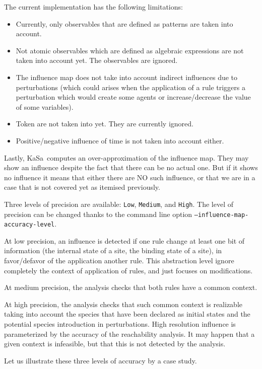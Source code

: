 \documentclass[11pt]{book}
\begin{document}
The current implementation has the following limitations:
\begin{itemize}
\item Currently, only observables that are defined as patterns are taken into account.
\item Not atomic observables which are defined as algebraic expressions are not taken into account yet. The observables are ignored.
\item The influence map does not take into account indirect influences due to perturbations (which could arises when the application of a rule triggers a perturbation which would create some agents or increase/decrease the value of some variables).
\item Token are not taken into yet. They are currently ignored.
\item Positive/negative influence of time is not taken into account either.
\end{itemize}

Lastly, KaSa\ computes an over-approximation of the influence map. They may show an influence despite the fact that there can be no actual one. But if it shows no influence it means that either there are NO such influence, or that we are in a case that is not covered yet as itemised previously.

Three levels of precision are available: \texttt{Low}, \texttt{Medium}, and
\texttt{High}. The level of precision can be changed thanks to the command line option \texttt{--influence-map-accuracy-level}.

At low precision, an influence is detected if one rule change at least one bit of information (the internal state of a site, the binding state of a site), in favor/defavor of the application another rule. This abstraction level ignore completely the context of application of rules, and just focuses on modifications.

At medium precision, the analysis checks that both rules have a common context.

At high precision, the analysis checks that such common context is realizable taking into account the species that have been declared as initial states
and the potential species introduction in perturbations. High resolution influence is parameterized by the accuracy of the reachability analysis.
It may happen that a given context is infeasible, but that this is not detected by the analysis.

Let us illustrate these three levels of accuracy by a case study.
\end{document}
